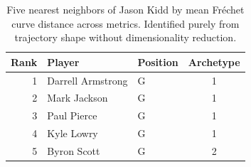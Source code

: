 \begin{table}[htbp]
  \centering\small
  \begin{tabular}{rllc}
    \toprule
    Rank & Player & Position & Archetype \\
    \midrule
    1 & Darrell Armstrong & G & 1 \\
    2 & Mark Jackson & G & 1 \\
    3 & Paul Pierce & G & 1 \\
    4 & Kyle Lowry & G & 1 \\
    5 & Byron Scott & G & 2 \\
    \bottomrule
  \end{tabular}
  \caption{Five nearest neighbors of Jason Kidd by mean Fr\'{e}chet curve distance across metrics. Identified purely from trajectory shape without dimensionality reduction.}
  \label{tab:Jason_Kidd_frechet_curve_neighbors}
\end{table}


